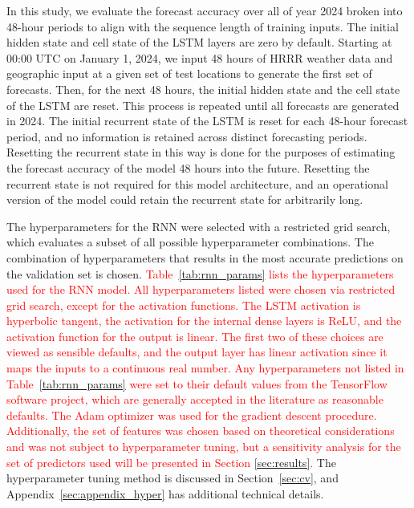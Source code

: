 \documentclass[fire,article,submit,pdftex,moreauthors]{Definitions/mdpi}
\begin{document}
In this study, we evaluate the forecast accuracy over all of year 2024 broken into 48-hour periods to align with the sequence length of training inputs. The initial hidden state and cell state of the LSTM layers are zero by default. Starting at 00:00 UTC on January 1, 2024, we input 48 hours of HRRR weather data and geographic input at a given set of test locations to generate the first set of forecasts. Then, for the next 48 hours, the initial hidden state and the cell state of the LSTM are reset. This process is repeated until all forecasts are generated in 2024. The initial recurrent state of the LSTM is reset for each 48-hour forecast period, and no information is retained across distinct forecasting periods. Resetting the recurrent state in this way is done for the purposes of estimating the forecast accuracy of the model 48 hours into the future. Resetting the recurrent state is not required for this model architecture, and an operational version of the model could retain the recurrent state for arbitrarily long.

The hyperparameters for the RNN were selected with a restricted grid search, which evaluates a subset of all possible hyperparameter combinations. The combination of hyperparameters that results in the most accurate predictions on the validation set is chosen. \textcolor{red}{Table~\ref{tab:rnn_params} lists the hyperparameters used for the RNN model. All hyperparameters listed were chosen via restricted grid search, except for the activation functions. The LSTM activation is hyperbolic tangent, the activation for the internal dense layers is ReLU, and the activation function for the output is linear. The first two of these choices are viewed as sensible defaults, and the output layer has linear activation since it maps the inputs to a continuous real number. Any hyperparameters not listed in Table~\ref{tab:rnn_params} were set to their default values from the TensorFlow software project, which are generally accepted in the literature as reasonable defaults. The Adam optimizer was used for the gradient descent procedure. Additionally, the set of features was chosen based on theoretical considerations and was not subject to hyperparameter tuning, but a sensitivity analysis for the set of predictors used will be presented in Section \ref{sec:results}.} The hyperparameter tuning method is discussed in Section~\ref{sec:cv}, and Appendix~\ref{sec:appendix_hyper} has additional technical details.
\end{document}
